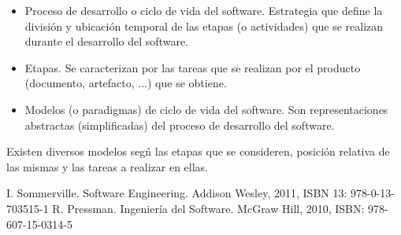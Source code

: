 \documentclass{article}
\begin{document}
\begin{itemize}
\item Proceso de desarrollo o ciclo de vida del software. Estrategia que define la división y ubicación temporal de las etapas (o actividades) que se realizan durante el desarrollo del software.

\item Etapas. Se caracterizan por las tareas que se realizan por el producto (documento, artefacto, ...) que se obtiene.

\item Modelos (o paradigmas) de ciclo de vida del software. Son representaciones abstractas (simplificadas) del proceso de desarrollo del software.
\end{itemize}

Existen diversos modelos segń las etapas que se consideren, posición relativa de las mismas y las tareas a realizar en ellas.

\begin{thebibliography}{99}
\bibitem I. Sommerville. Software Engineering. Addison Wesley, 2011, ISBN 13: 978-0-13-703515-1
\bibitem R. Pressman. Ingeniería del Software. McGraw Hill, 2010, ISBN: 978-607-15-0314-5
\end{thebibliography}
\end{document}
